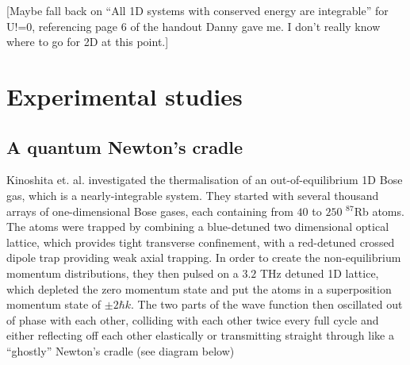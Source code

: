 \documentclass[a4paper, 10pt, draft]{article}
\theoremstyle{plain}
\begin{document}
 [Maybe fall back on ``All 1D systems with conserved
energy are integrable'' for U!=0, referencing page 6 of the handout Danny gave
me. I don't really know where to go for 2D at this point.]


\section{Experimental studies}

\subsection{A quantum Newton's cradle}

Kinoshita et. al. investigated \cite{Kinoshita2006} the thermalisation of an
out-of-equilibrium 1D Bose gas, which is a  nearly-integrable system. They
started with several thousand arrays of one-dimensional Bose gases, each
containing from $40$ to $250$ $^{87}$Rb atoms. The atoms were trapped by
combining a blue-detuned  two dimensional optical lattice, which provides
tight transverse confinement, with a red-detuned crossed dipole trap
providing weak axial trapping. In order
to create the non-equilibrium momentum distributions, they then pulsed on a
$3.2$ THz detuned 1D lattice, which depleted the zero momentum state
and put the atoms in a superposition momentum state of $\pm2\hbar k$. The two
parts of the wave function then oscillated out of phase with each other,
colliding with each other twice every full cycle and either reflecting off
each other elastically or transmitting straight through like a ``ghostly''
Newton's cradle (see diagram below)
\end{document}
